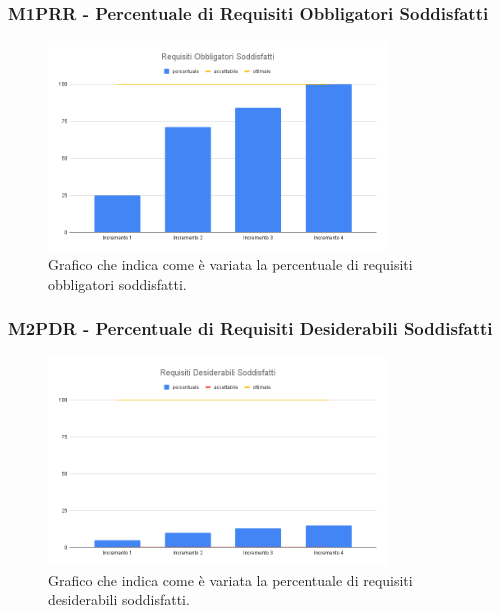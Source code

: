 \subsubsection{M1PRR - Percentuale di Requisiti Obbligatori Soddisfatti}
\begin{figure}[H]
    \centering\includegraphics[width=0.8\textwidth, height=0.8\textheight,keepaspectratio]{images/PB-Requisiti-Obbligatori-Soddisfatti.png}
    \caption{Grafico che indica come è variata la percentuale di requisiti obbligatori soddisfatti.}
\end{figure}  

\subsubsection{M2PDR - Percentuale di Requisiti Desiderabili Soddisfatti}
\begin{figure}[H]
    \centering\includegraphics[width=0.8\textwidth, height=0.8\textheight,keepaspectratio]{images/PB-Requisiti-Desiderabili-Soddisfatti.png}
    \caption{Grafico che indica come è variata la percentuale di requisiti desiderabili soddisfatti.}
\end{figure}  